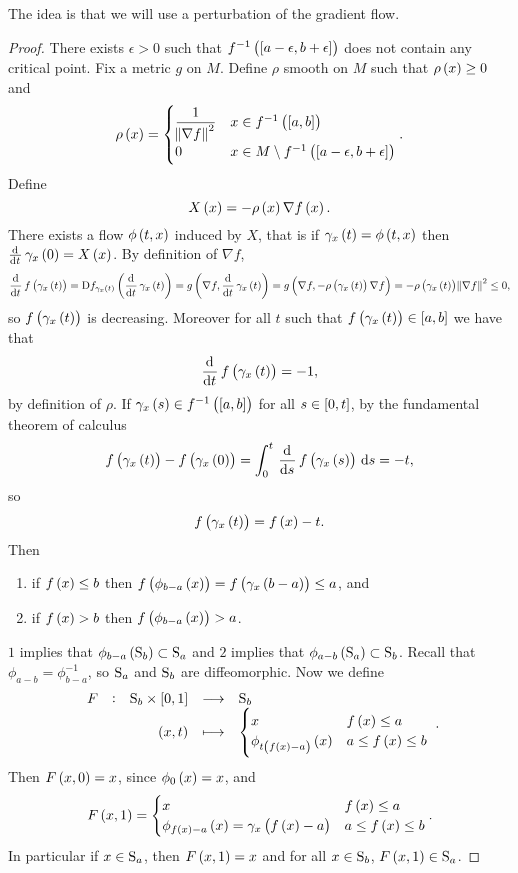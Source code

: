 The idea is that we will use a perturbation of the gradient flow.

\pagebreak

\begin{proof}
There exists $ \epsilon > 0 $ such that $ f^{-1}\br{\sbr{a - \epsilon, b + \epsilon}} $ does not contain any critical point. Fix a metric $ g $ on $ M $. Define $ \rho $ smooth on $ M $ such that $ \rho\br{x} \ge 0 $ and
$$ \rho\br{x} =
\begin{cases}
\dfrac{1}{\norm{\nabla f}^2} & x \in f^{-1}\br{\sbr{a, b}} \\
0 & x \in M \setminus f^{-1}\br{\sbr{a - \epsilon, b + \epsilon}}
\end{cases}.
$$
Define
$$ X\br{x} = -\rho\br{x}\nabla f\br{x}. $$
There exists a flow $ \phi\br{t, x} $ induced by $ X $, that is if $ \gamma_x\br{t} = \phi\br{t, x} $ then $ \tod{}{t}\gamma_x\br{0} = X\br{x} $. By definition of $ \nabla f $,
$$ \dod{}{t}f\br{\gamma_x\br{t}} = \D f_{\gamma_x\br{t}}\br{\dod{}{t}\gamma_x\br{t}} = g\br{\nabla f, \dod{}{t}\gamma_x\br{t}} = g\br{\nabla f, -\rho\br{\gamma_x\br{t}}\nabla f} = -\rho\br{\gamma_x\br{t}}\norm{\nabla f}^2 \le 0, $$
so $ f\br{\gamma_x\br{t}} $ is decreasing. Moreover for all $ t $ such that $ f\br{\gamma_x\br{t}} \in \sbr{a, b} $ we have that
$$ \dod{}{t}f\br{\gamma_x\br{t}} = -1, $$
by definition of $ \rho $. If $ \gamma_x\br{s} \in f^{-1}\br{\sbr{a, b}} $ for all $ s \in \sbr{0, t} $, by the fundamental theorem of calculus
$$ f\br{\gamma_x\br{t}} - f\br{\gamma_x\br{0}} = \intd{0}{t}{\dod{}{s}f\br{\gamma_x\br{s}}}{s} = -t, $$
so
$$ f\br{\gamma_x\br{t}} = f\br{x} - t. $$
Then
\begin{enumerate}
\item if $ f\br{x} \le b $ then $ f\br{\phi_{b - a}\br{x}} = f\br{\gamma_x\br{b - a}} \le a $, and
\item if $ f\br{x} > b $ then $ f\br{\phi_{b - a}\br{x}} > a $.
\end{enumerate}
$ 1 $ implies that $ \phi_{b - a}\br{\S_b} \subset \S_a $ and $ 2 $ implies that $ \phi_{a - b}\br{\S_a} \subset \S_b $. Recall that $ \phi_{a - b} = \phi_{b - a}^{-1} $, so $ \S_a $ and $ \S_b $ are diffeomorphic. Now we define
$$ \function[F]{\S_b \times \sbr{0, 1}}{\S_b}{\br{x, t}}{
\begin{cases}
x & f\br{x} \le a \\
\phi_{t\br{f\br{x} - a}}\br{x} & a \le f\br{x} \le b
\end{cases}
}. $$
Then $ F\br{x, 0} = x $, since $ \phi_0\br{x} = x $, and
$$ F\br{x, 1} =
\begin{cases}
x & f\br{x} \le a \\
\phi_{f\br{x} - a}\br{x} = \gamma_x\br{f\br{x} - a} & a \le f\br{x} \le b
\end{cases}.
$$
In particular if $ x \in \S_a $, then $ F\br{x, 1} = x $ and for all $ x \in \S_b $, $ F\br{x, 1} \in \S_a $.
\end{proof}

